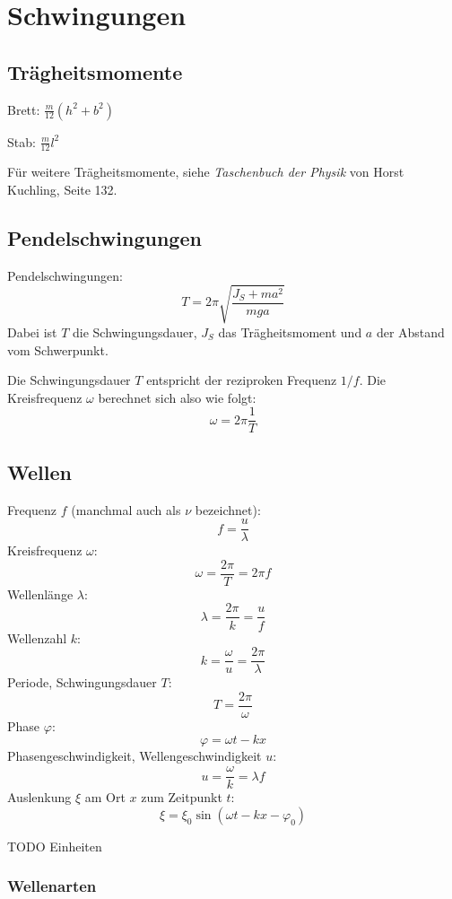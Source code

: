 \section{Schwingungen}

\subsection{Trägheitsmomente}

Brett: $\displaystyle\frac{m}{12} \left(h^2 + b^2\right)$

Stab: $\displaystyle\frac{m}{12} l^2$

Für weitere Trägheitsmomente, siehe \textit{Taschenbuch der Physik} von Horst
Kuchling, Seite 132.

\subsection{Pendelschwingungen}

Pendelschwingungen:
\[
	T = 2 \pi \sqrt{\frac{J_S + ma^2}{mga}}	
\]
Dabei ist $T$ die Schwingungsdauer, $J_S$ das Trägheitsmoment und $a$ der
Abstand vom Schwerpunkt.

Die Schwingungsdauer $T$ entspricht der reziproken Frequenz $1/f$. Die
Kreisfrequenz $\omega$ berechnet sich also wie folgt:
\[
	\omega = 2\pi\frac{1}{T}
\]

\subsection{Wellen}



Frequenz $f$ (manchmal auch als $\nu$ bezeichnet):
\[
	f = \frac{u}{\lambda}
\]
Kreisfrequenz $\omega$:
\[
	\omega = \frac{2 \pi}{T} = 2 \pi f
\]
Wellenlänge $\lambda$:
\[
	\lambda = \frac{2 \pi}{k} = \frac{u}{f}
\]
Wellenzahl $k$:
\[
k = \frac{\omega}{u} = \frac{2 \pi}{\lambda}
\]
Periode, Schwingungsdauer $T$:
\[
	T = \frac{2 \pi}{\omega}
\]
Phase $\varphi$:
\[
	\varphi = \omega t - k x
\]
Phasengeschwindigkeit, Wellengeschwindigkeit $u$:
\[
	u = \frac{\omega}{k} = \lambda f
\]
Auslenkung $\xi$ am Ort $x$ zum Zeitpunkt $t$:
\[
	\xi = \xi_0 \sin (\omega t - k x - \varphi_0)
\]

TODO Einheiten

\subsubsection{Wellenarten}

